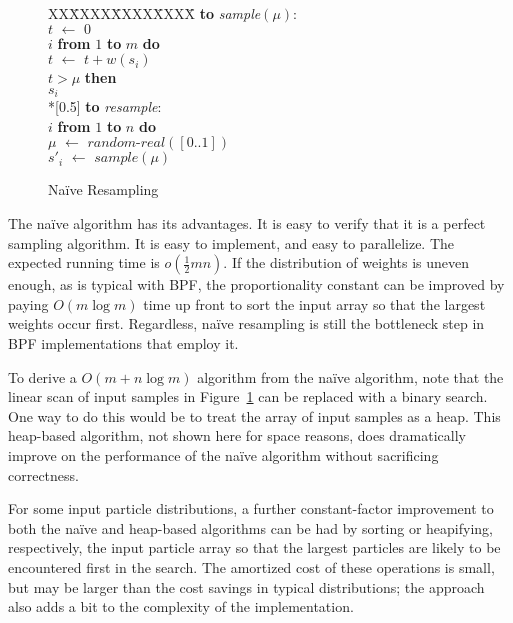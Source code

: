 \documentclass{article}
\newcommand{\asgn}{\,\,\leftarrow\,\,}
\newcommand{\newcode}{\\*[0.5\baselineskip]}
\begin{document}
  \begin{figure}
    \centering
    \begin{minipage}[b]{\linewidth}
      \begin{tabbing}
      XX\=XXXX\=XXXX\=XXXX\=\kill
      {\bf to} {\it sample}$(\mu)$: \\
      \>$t \asgn 0$ \\
       $i$ {\bf from} $1$ {\bf to} $m$ {\bf do} \\
      \>\>$t \asgn t + w(s_i)$ \\
      \> $t > \mu$ {\bf then} \\
      \>\> $s_i$ \newcode
      {\bf to} {\it resample}: \\
       $i$ {\bf from} $1$ {\bf to} $n$ {\bf do} \\
      \>\>$\mu \asgn \textit{random-real}([0..1])$ \\
      \>\>$s'_i \asgn sample(\mu)$
      \end{tabbing}
    \end{minipage}
    \caption{Na\"ive Resampling}\label{fig:omn}
  \end{figure}

  The na\"ive algorithm has its advantages.  It is easy to
  verify that it is a perfect sampling algorithm.  It is
  easy to implement, and easy to parallelize.  The expected
  running time is $o(\frac{1}{2}mn)$.  If the distribution
  of weights is uneven enough, as is typical with BPF, the
  proportionality constant can be improved by paying $O(m
  \log m)$ time up front to sort the input array so that the
  largest weights occur first.  Regardless, na\"ive
  resampling is still the bottleneck step in BPF
  implementations that employ it.

  To derive a $O(m + n \log m)$ algorithm from the na\"ive
  algorithm, note that the linear scan of input samples in
  Figure~\ref{fig:omn} can be replaced with a binary
  search.  One way to do this would be to treat the array of
  input samples as a heap.  This heap-based algorithm, not
  shown here for space reasons, does dramatically improve on
  the performance of the na\"ive algorithm without
  sacrificing correctness.

  For some input particle distributions, a further
  constant-factor improvement to both the na\"ive and
  heap-based algorithms can be had by sorting or heapifying,
  respectively, the input particle array so that the largest
  particles are likely to be encountered first in the
  search.  The amortized cost of these operations is small,
  but may be larger than the cost savings in typical
  distributions; the approach also adds a bit to the
  complexity of the implementation.
\end{document}
